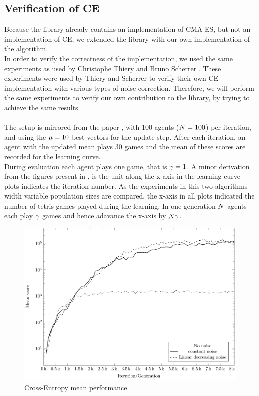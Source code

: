 \subsection{Verification of CE \label{varifyofce}}

Because the \shark library already contains an implementation of 
CMA-ES, but not an implementation of CE, we extended the library 
with our own implementation of the algorithm.\\
In order to verify the correctness of the implementation, 
we used the same experiments as used by 
Christophe Thiery and Bruno Scherrer \citep{thiery:09}. 
These experiments were used by Thiery and Scherrer to 
verify their own CE implementation with various types of noise correction. 
Therefore, we will perform the same experiments to verify our 
own contribution to the \shark library, by trying to achieve the same results.\\
\\
The setup is mirrored from the paper \citep{thiery:09}, 
with 100 agents ($N = 100$) per iteration,
and using the $\mu = 10$ best vectors
for the update step. After each iteration, 
an agent with the updated mean 
plays 30 games and the mean of these scores are recorded for the
learning curve.\\
During evaluation each agent plays one game, that is $\gamma = 1$.
A minor derivation from the figures present in \citep{thiery:09}, is 
the unit along the x-axis in the learning curve plots indicates 
the iteration number. As the experiments in this two algorithms
width variable population sizes are compared, the x-axis in all plots
indicated the number of tetris games played during the learning. In one 
generation $N$ agents each play $\gamma$ games and hence
adavance the x-axis by $N \gamma$.\\

\begin{figure}[H]
\begin{center}
\includegraphics[scale=0.8]{plots/meansPlot}
\end{center}
\caption{Cross-Entropy mean performance \label{fig:cemean}}
\end{figure}

